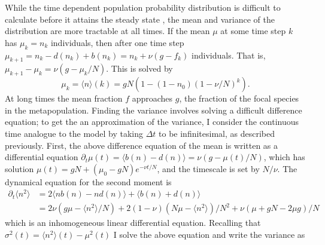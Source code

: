While the time dependent population probability distribution is difficult to calculate before it attains the steady state \cite{McKane2004b}, the mean and variance of the distribution are more tractable at all times. 
If the mean $\mu$ at some time step $k$ has $\mu_k=n_k$ individuals, then after one time step $\mu_{k+1}= n_k - d(n_k) + b(n_k) = n_k + \nu(g-f_k)$ individuals. 
That is, $\mu_{k+1}-\mu_k = \nu(g-\mu_k/N)$. 
This is solved by 
\begin{equation}
 \mu_k = \langle n\rangle(k) = g N \left( 1 - (1-n_0)(1-\nu/N)^k\right).
\end{equation}
At long times the mean fraction $f$ approaches $g$, the fraction of the focal species in the metapopulation. 
Finding the variance involves solving a difficult difference equation; to get the an approximation of the variance, I consider the continuous time analogue to the model by taking $\Delta t$ to be infinitesimal, as described previously. 
First, the above difference equation of the mean is written as a differential equation $\partial_t\mu(t) = \langle b(n)-d(n)\rangle = \nu\left(g-\mu(t)/N\right)$, which has solution $\mu(t) = g N  + (\mu_0-g N)e^{-\nu t/N}$, and the timescale is set by $N/\nu$. 
The dynamical equation for the second moment is
\begin{align*}
 \partial_t\langle n^2\rangle &= 2\langle n b(n) - n d(n)\rangle + \langle b(n) + d(n)\rangle \\
                              &= 2\nu \left( g \mu - \langle n^2\rangle/N\right) + 2(1-\nu)\left(N\mu-\langle n^2\rangle\right)/N^2 + \nu(\mu + g N - 2 \mu g)/N
\end{align*}
which is an inhomogeneous linear differential equation. 
Recalling that $\sigma^2(t) = \langle n^2\rangle(t) - \mu^2(t)$ I solve the above equation and write the variance as
